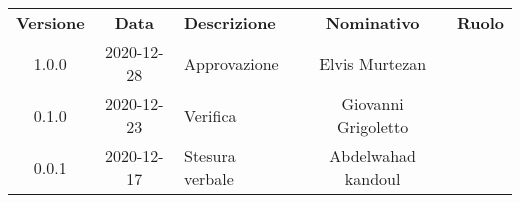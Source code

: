 {
    \renewcommand{\arraystretch}{1.5}
    \centering
    \begin{longtable}{ c c  C{4cm}  c  c }
        \rowcolor{\primaryColor}
        \textcolor{\secondaryColor}{
        \textbf{Versione}}     & \textcolor{\secondaryColor}{\textbf{Data}}       & \textcolor{\secondaryColor}
        {\textbf{Descrizione}} & \textcolor{\secondaryColor}{\textbf{Nominativo}} & \textcolor{\secondaryColor}{\textbf{Ruolo}}                          \\


        1.0.0                  & 2020-12-28                                       & Approvazione                                & Elvis Murtezan & \responsabile{} \\
        0.1.0                  & 2020-12-23                                       & Verifica                                    & Giovanni Grigoletto & \verificatore{} \\
        0.0.1                  & 2020-12-17 & Stesura verbale & Abdelwahad kandoul & \redattore{}    \\
    \end{longtable}
}